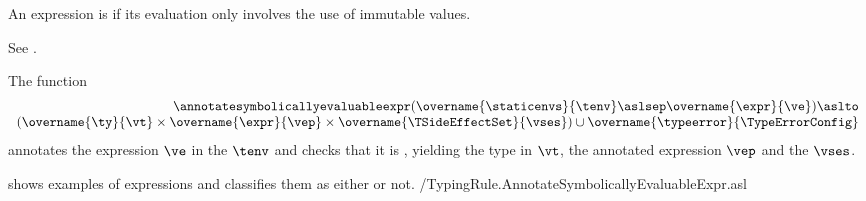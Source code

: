 \begin{mathpar}
\end{mathpar}

\begin{mathpar}
\end{mathpar}

\begin{mathpar}
\end{mathpar}

An expression is \symbolicallyevaluableterm{} if its evaluation only involves
the use of immutable values.

See .

\hypertarget{def-annotatesymbolicallyevaluableexpr}{}
The function
\[
\begin{array}{r}
  \annotatesymbolicallyevaluableexpr(\overname{\staticenvs}{\tenv} \aslsep \overname{\expr}{\ve}) \aslto \\
  (\overname{\ty}{\vt}\times\overname{\expr}{\vep}\times\overname{\TSideEffectSet}{\vses}) \cup \overname{\typeerror}{\TypeErrorConfig}
\end{array}
\]
annotates the expression $\ve$ in the \staticenvironmentterm{} $\tenv$ and checks that it is \symbolicallyevaluableterm,
yielding the type in $\vt$, the annotated expression $\vep$ and the \sideeffectsetterm{} $\vses$.
\ProseOtherwiseTypeError

 shows examples of
expressions and classifies them as either \symbolicallyevaluableterm{} or not.
{\typingtests/TypingRule.AnnotateSymbolicallyEvaluableExpr.asl}

